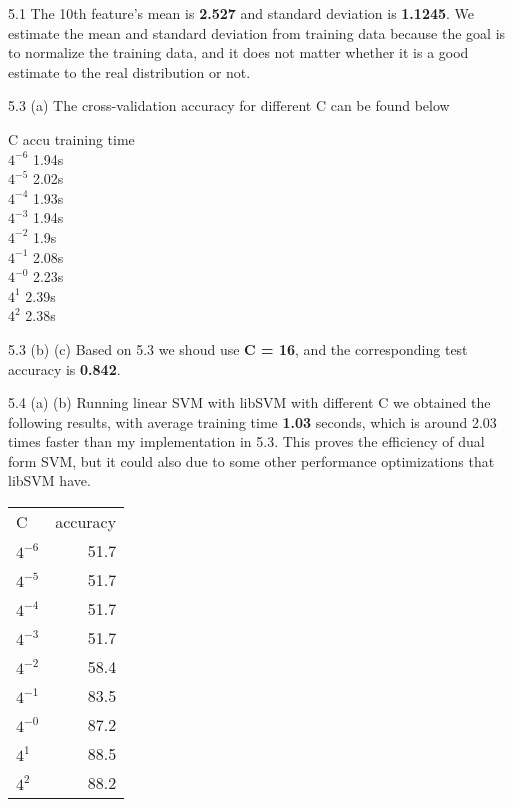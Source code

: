 \documentclass[12pt]{article}
\newenvironment{problem}[2][Problem]{\begin{trivlist}
\item[\hskip \labelsep {\bfseries #1}\hskip \labelsep {\bfseries #2}]}{\end{trivlist}}
\begin{document}
\begin{problem}{5. Programming}
\item{5.1}
The 10th feature's mean is \textbf{2.527} and standard deviation is \textbf{1.1245}. We estimate the mean and standard deviation from training data because the goal is to normalize the training data, and it does not matter whether it is a good estimate to the real distribution or not.
\item{5.3 (a)}
The cross-validation accuracy for different C can be found below
\begin{center}
	C     \:\: accu \:\: training time\\
	$4^{-6}$  \: 1.94s\\
	$4^{-5}$  \: 2.02s\\
	$4^{-4}$  \: 1.93s\\
	$4^{-3}$  \: 1.94s\\
	$4^{-2}$  \: 1.9s\\
	$4^{-1}$  \: 2.08s\\
	$4^{-0}$  \: 2.23s\\
	$4^1$ \:\: \: 2.39s\\
	$4^2$ \:\: \: 2.38s\\
\end{center}
\item{5.3 (b) (c)}
Based on 5.3 we shoud use \textbf{C = 16}, and the corresponding test accuracy is \textbf{0.842}.
\item{5.4 (a) (b)}
Running linear SVM with libSVM with different C we obtained the following results, with average training time \textbf{1.03} seconds, which is around 2.03 times faster than my implementation in 5.3. This proves the efficiency of dual form SVM, but it could also due to some other performance optimizations that libSVM have. 
\begin{center}
\begin{tabular}{ l | r}
    C &  accuracy\\
    $4^{-6}$  & 51.7\\
    $4^{-5}$  & 51.7\\
    $4^{-4}$  & 51.7\\
    $4^{-3}$  & 51.7\\
    $4^{-2}$  & 58.4\\
    $4^{-1}$  & 83.5\\
    $4^{-0}$  & 87.2\\
    $4^{1}$  & 88.5\\
    $4^{2}$  & 88.2\\
\end{tabular}
\end{center}


\end{problem}
\end{document}

